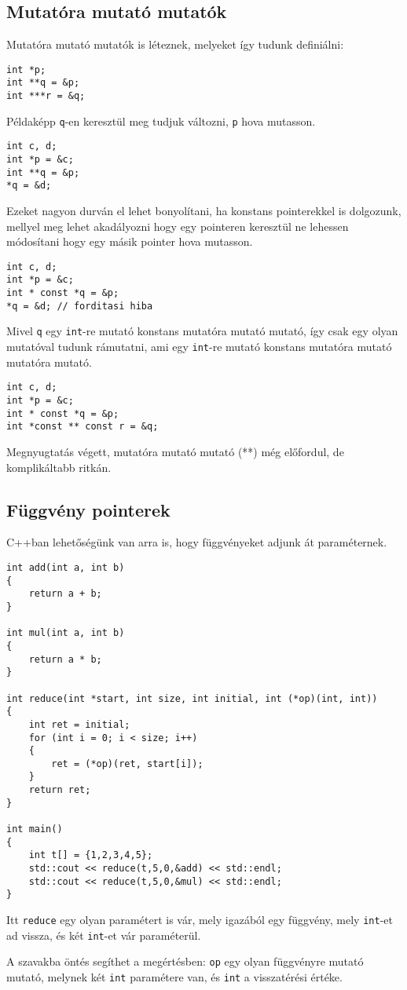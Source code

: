 \documentclass[a4paper,11.5pt,table]{article}
\begin{document}
	\subsection{Mutatóra mutató mutatók} %
	Mutatóra mutató mutatók is léteznek, melyeket így tudunk definiálni:
	\begin{lstlisting}
int *p;
int **q = &p;
int ***r = &q;
	\end{lstlisting}
	Példaképp \texttt{q}-en keresztül meg tudjuk változni, \texttt{p} hova mutasson.
	\begin{lstlisting}
int c, d;
int *p = &c;
int **q = &p;
*q = &d;
	\end{lstlisting}
	Ezeket nagyon durván el lehet bonyolítani, ha konstans pointerekkel is dolgozunk, mellyel meg lehet akadályozni hogy egy pointeren keresztül ne lehessen módosítani hogy egy másik pointer hova mutasson.
	\begin{lstlisting}
int c, d;
int *p = &c;
int * const *q = &p;
*q = &d; // forditasi hiba
	\end{lstlisting}
	Mivel \texttt{q} egy \texttt{int}-re mutató konstans mutatóra mutató mutató, így csak egy olyan mutatóval tudunk rámutatni, ami egy \texttt{int}-re mutató konstans mutatóra mutató mutatóra mutató.
	\begin{lstlisting}
int c, d;
int *p = &c;
int * const *q = &p;
int *const ** const r = &q;
	\end{lstlisting}
	\begin{note}
		Megnyugtatás végett, mutatóra mutató mutató (**) még előfordul, de komplikáltabb ritkán.
	\end{note}
	\subsection{Függvény pointerek}
	C++ban lehetőségünk van arra is, hogy függvényeket adjunk át paraméternek.
	\begin{lstlisting}
int add(int a, int b)
{
	return a + b;
}

int mul(int a, int b)
{
	return a * b;
}

int reduce(int *start, int size, int initial, int (*op)(int, int))
{
	int ret = initial;
	for (int i = 0; i < size; i++)
	{
		ret = (*op)(ret, start[i]);
	}
	return ret;
}

int main()
{
	int t[] = {1,2,3,4,5};
	std::cout << reduce(t,5,0,&add) << std::endl;
	std::cout << reduce(t,5,0,&mul) << std::endl;
}
	\end{lstlisting}
	
	Itt \texttt{reduce} egy olyan paramétert is vár, mely igazából egy függvény, mely \texttt{int}-et ad vissza, és két \texttt{int}-et vár paraméterül.
	\begin{note}
		A szavakba öntés segíthet a megértésben: \texttt{op} egy olyan függvényre mutató mutató, melynek két \texttt{int} paramétere van, és \texttt{int} a visszatérési értéke.
	\end{note}
	
\end{document}
